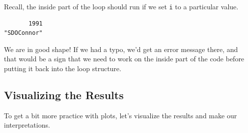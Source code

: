 \documentclass[
  letterpaper,
  DIV=11,
  numbers=noendperiod]{scrreprt}
\newenvironment{Shaded}{\begin{snugshade}}{\end{snugshade}}
\newcommand{\DecValTok}[1]{\textcolor[rgb]{0.68,0.00,0.00}{#1}}
\newcommand{\FunctionTok}[1]{\textcolor[rgb]{0.28,0.35,0.67}{#1}}
\newcommand{\NormalTok}[1]{\textcolor[rgb]{0.00,0.23,0.31}{#1}}
\newcommand{\OtherTok}[1]{\textcolor[rgb]{0.00,0.23,0.31}{#1}}
\newcommand{\SpecialCharTok}[1]{\textcolor[rgb]{0.37,0.37,0.37}{#1}}
\begin{document}
Recall, the inside part of the loop should run if we set \texttt{i} to a
particular value.

\begin{Shaded}
\end{Shaded}

\begin{verbatim}
       1991 
"SDOConnor" 
\end{verbatim}

We are in good shape! If we had a typo, we'd get an error message there,
and that would be a sign that we need to work on the inside part of the
code before putting it back into the loop structure.

\hypertarget{visualizing-the-results}{%
\subsection{Visualizing the Results}\label{visualizing-the-results}}

To get a bit more practice with plots, let's visualize the results and
make our interpretations.
\end{document}
